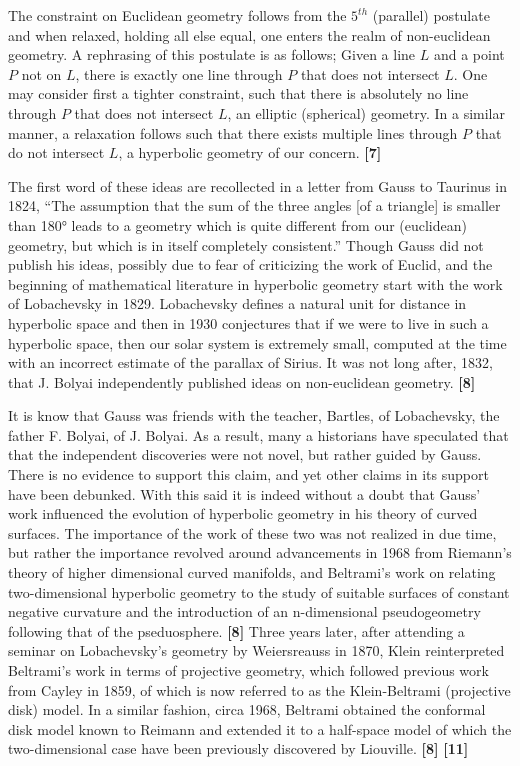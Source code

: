 \documentclass[12pt]{article}
\begin{document}
The constraint on Euclidean geometry follows from the $5^{th}$ (parallel) postulate and when relaxed, 
holding all else equal, one enters the realm of non-euclidean geometry. 
A rephrasing of this postulate is as follows; Given a line $ L $ and a point $ P $ not on $ L $, 
there is exactly one line through $ P $ that does not intersect $ L $.
One may consider first a tighter constraint, such that there is absolutely no line 
through $ P $ that does not intersect $ L $, an elliptic (spherical) geometry. 
In a similar manner, a relaxation follows such that there exists multiple lines 
through $ P $ that do not intersect $ L $, a hyperbolic geometry of our concern. \textbf{[7]} 

\hspace{5mm}
The first word of these ideas are recollected in a letter from Gauss to Taurinus in 1824, 
``The assumption that the sum of the three angles [of a triangle] is smaller than 180° leads to a geometry 
which is quite different from our (euclidean) geometry, but which is in itself completely consistent.'' 
Though Gauss did not publish his ideas, possibly due to fear of criticizing the work of Euclid, 
and the beginning of mathematical literature in hyperbolic geometry start with the work of Lobachevsky in 1829. 
Lobachevsky defines a natural unit for distance in hyperbolic space and then in 1930 conjectures that if we were to live 
in such a hyperbolic space, then our solar system is extremely small, computed at the time with an incorrect estimate of the parallax of Sirius.  
It was not long after, 1832, that J. Bolyai independently published ideas on non-euclidean geometry. \textbf{[8]} 

\hspace{5mm}
It is know that Gauss was friends with the teacher, Bartles, of Lobachevsky, the father F. Bolyai, of J. Bolyai. 
As a result, many a historians have speculated that that the independent discoveries were not novel, but rather guided by Gauss. 
There is no evidence to support this claim, and yet other claims in its support have been debunked.
With this said it is indeed without a doubt that Gauss' work influenced the evolution of hyperbolic geometry in his theory of curved surfaces. 
The importance of the work of these two was not realized in due time, but rather the importance revolved around advancements in 1968 from
Riemann's theory of higher dimensional curved manifolds, and Beltrami's work on relating two-dimensional hyperbolic geometry to the 
study of suitable surfaces of constant negative curvature and the introduction of an n-dimensional pseudogeometry following that of the pseduosphere. \textbf{[8]} 
Three years later, after attending a seminar on Lobachevsky's geometry by Weiersreauss in 1870, Klein reinterpreted Beltrami's work in terms of projective geometry, 
which followed previous work from Cayley in 1859, of which is now referred to as the Klein-Beltrami (projective disk) model.
In a similar fashion, circa 1968, Beltrami obtained the conformal disk model known to Reimann and extended it to a half-space model 
of which the two-dimensional case have been previously discovered by Liouville. \textbf{[8]} \textbf{[11]} 
\end{document}
